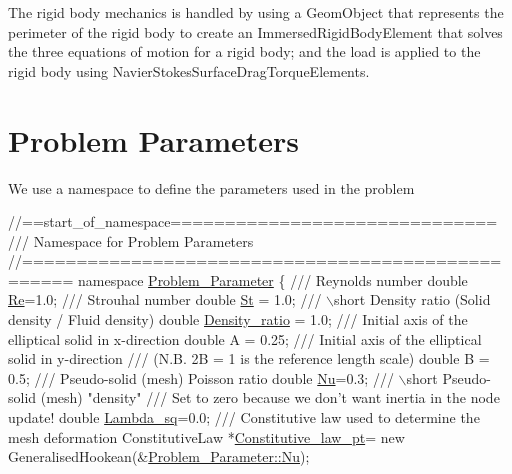 The rigid body mechanics is handled by using a {\ttfamily Geom\+Object} that represents the perimeter of the rigid body to create an {\ttfamily Immersed\+Rigid\+Body\+Element} that solves the three equations of motion for a rigid body; and the load is applied to the rigid body using {\ttfamily Navier\+Stokes\+Surface\+Drag\+Torque\+Elements}.



 

\hypertarget{index_global}{}\section{Problem Parameters}\label{index_global}
We use a namespace to define the parameters used in the problem

 
\begin{DoxyCodeInclude}
\textcolor{comment}{//==start\_of\_namespace==============================}
\textcolor{comment}{/// Namespace for Problem Parameters}
\textcolor{comment}{}\textcolor{comment}{//==================================================}
 \textcolor{keyword}{namespace }\hyperlink{namespaceProblem__Parameter}{Problem\_Parameter}
 \{    \textcolor{comment}{}
\textcolor{comment}{  /// Reynolds number}
\textcolor{comment}{}  \textcolor{keywordtype}{double} \hyperlink{namespaceProblem__Parameter_acc656299287d4d9a8374c2c501750b4f}{Re}=1.0;
\textcolor{comment}{}
\textcolor{comment}{  /// Strouhal number}
\textcolor{comment}{}  \textcolor{keywordtype}{double} \hyperlink{namespaceProblem__Parameter_a8d9b76e390569bac0095bd0952281a30}{St} = 1.0;
 \textcolor{comment}{}
\textcolor{comment}{  /// \(\backslash\)short Density ratio (Solid density / Fluid density)}
\textcolor{comment}{}  \textcolor{keywordtype}{double} \hyperlink{namespaceProblem__Parameter_a7fcb9a415485247d626190923235be2a}{Density\_ratio} = 1.0;
\textcolor{comment}{}
\textcolor{comment}{  /// Initial axis of the elliptical solid in x-direction}
\textcolor{comment}{}  \textcolor{keywordtype}{double} A = 0.25;
  \textcolor{comment}{}
\textcolor{comment}{  /// Initial axis of the elliptical solid in y-direction}
\textcolor{comment}{  /// (N.B. 2B = 1 is the reference length scale)}
\textcolor{comment}{}  \textcolor{keywordtype}{double} B = 0.5;
\textcolor{comment}{}
\textcolor{comment}{  /// Pseudo-solid (mesh) Poisson ratio}
\textcolor{comment}{}  \textcolor{keywordtype}{double} \hyperlink{namespaceProblem__Parameter_abec2e733c8f2d3c18ebc702b3f80cc17}{Nu}=0.3;
\textcolor{comment}{}
\textcolor{comment}{  /// \(\backslash\)short Pseudo-solid (mesh) "density" }
\textcolor{comment}{  /// Set to zero because we don't want inertia in the node update!}
\textcolor{comment}{}  \textcolor{keywordtype}{double} \hyperlink{namespaceProblem__Parameter_a20ea33c391abd96d43f79913377c1e12}{Lambda\_sq}=0.0;
\textcolor{comment}{}
\textcolor{comment}{  /// Constitutive law used to determine the mesh deformation}
\textcolor{comment}{}  ConstitutiveLaw *\hyperlink{namespaceProblem__Parameter_a9852a6077458693983628319d429f11f}{Constitutive\_law\_pt}=   
   \textcolor{keyword}{new} GeneralisedHookean(&\hyperlink{namespaceProblem__Parameter_abec2e733c8f2d3c18ebc702b3f80cc17}{Problem\_Parameter::Nu});


\end{DoxyCodeInclude}
